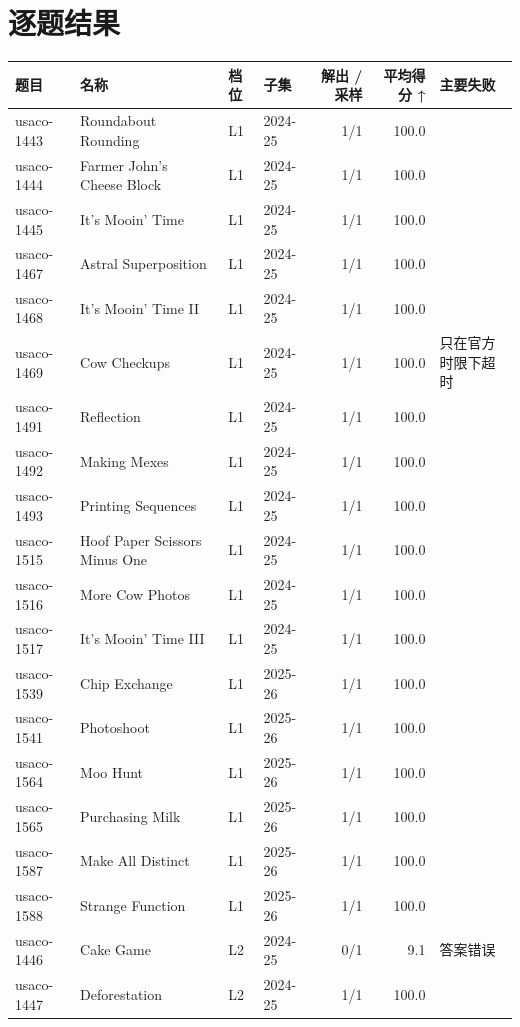 \documentclass[11pt,a4paper,fontset=none]{ctexart}
\begin{document}
\section{逐题结果}
{\footnotesize\setlength{\tabcolsep}{4pt}\begin{longtable}{@{}l>{\raggedright\arraybackslash}p{3.4cm}llrr>{\raggedright\arraybackslash}p{3.1cm}@{}}
\toprule
题目 & 名称 & 档位 & 子集 & 解出 / 采样 & 平均得分 ↑ & 主要失败 \\
\midrule\endhead
usaco-1443 & Roundabout Rounding & L1 & 2024-25 & 1/1 & 100.0 &  \\
usaco-1444 & Farmer John's Cheese Block & L1 & 2024-25 & 1/1 & 100.0 &  \\
usaco-1445 & It's Mooin' Time & L1 & 2024-25 & 1/1 & 100.0 &  \\
usaco-1467 & Astral Superposition & L1 & 2024-25 & 1/1 & 100.0 &  \\
usaco-1468 & It's Mooin' Time II & L1 & 2024-25 & 1/1 & 100.0 &  \\
usaco-1469 & Cow Checkups & L1 & 2024-25 & 1/1 & 100.0 & 只在官方时限下超时 \\
usaco-1491 & Reflection & L1 & 2024-25 & 1/1 & 100.0 &  \\
usaco-1492 & Making Mexes & L1 & 2024-25 & 1/1 & 100.0 &  \\
usaco-1493 & Printing Sequences & L1 & 2024-25 & 1/1 & 100.0 &  \\
usaco-1515 & Hoof Paper Scissors Minus One & L1 & 2024-25 & 1/1 & 100.0 &  \\
usaco-1516 & More Cow Photos & L1 & 2024-25 & 1/1 & 100.0 &  \\
usaco-1517 & It's Mooin' Time III & L1 & 2024-25 & 1/1 & 100.0 &  \\
usaco-1539 & Chip Exchange & L1 & 2025-26 & 1/1 & 100.0 &  \\
usaco-1541 & Photoshoot & L1 & 2025-26 & 1/1 & 100.0 &  \\
usaco-1564 & Moo Hunt & L1 & 2025-26 & 1/1 & 100.0 &  \\
usaco-1565 & Purchasing Milk & L1 & 2025-26 & 1/1 & 100.0 &  \\
usaco-1587 & Make All Distinct & L1 & 2025-26 & 1/1 & 100.0 &  \\
usaco-1588 & Strange Function & L1 & 2025-26 & 1/1 & 100.0 &  \\
usaco-1446 & Cake Game & L2 & 2024-25 & 0/1 & 9.1 & 答案错误 \\
usaco-1447 & Deforestation & L2 & 2024-25 & 1/1 & 100.0 &  \\

\end{longtable}}
\end{document}
